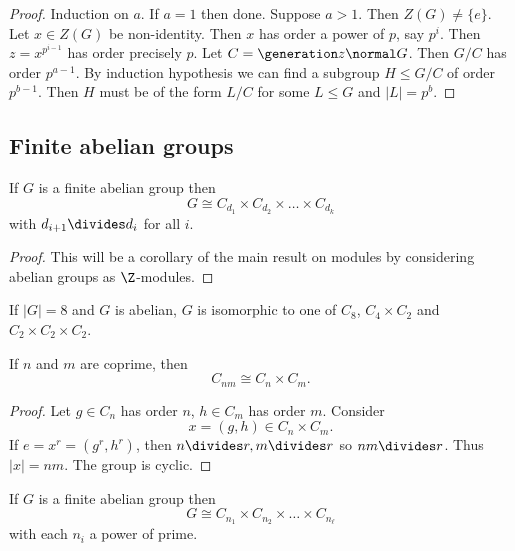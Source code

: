 \documentclass[a4paper]{article}
\theoremstyle{definition}
\begin{document}
\begin{proof}
  Induction on \(a\). If \(a = 1\) then done. Suppose \(a > 1\). Then \(Z(G) \neq \{e\}\). Let \(x \in Z(G)\) be non-identity. Then \(x\) has order  a power of \(p\), say \(p^i\). Then \(z = x^{p^{i - 1}}\) has order precisely \(p\). Let \(C = \generation z \normal G\). Then \(G/C\) has order \(p^{a - 1}\). By induction hypothesis we can find a subgroup \(H \leq G/C\) of order \(p^{b - 1}\). Then \(H\) must be of the form \(L/C\) for some \(L \leq G\) and \(|L| = p^b\).
\end{proof}

\subsection{Finite abelian groups}

\begin{theorem}
  If \(G\) is a finite abelian group then
  \[
    G \cong C_{d_1} \times C_{d_2} \times \dots \times C_{d_k}
  \]
  with \(d_{i + 1} \divides d_i\) for all \(i\).
\end{theorem}

\begin{proof}
  This will be a corollary of the main result on modules by considering abelian groups as \(\Z\)-modules.
\end{proof}

\begin{eg}
  If \(|G| = 8\) and \(G\) is abelian, \(G\) is isomorphic to one of \(C_8\), \(C_4 \times C_2\) and \(C_2 \times C_2 \times C_2\).
\end{eg}

\begin{lemma}
  If \(n\) and \(m\) are coprime, then
  \[
    C_{nm} \cong C_n \times C_m.
  \]
\end{lemma}

\begin{proof}
  Let \(g \in C_n\) has order \(n\), \(h \in C_m\) has order \(m\). Consider
  \[
    x = (g, h) \in C_n \times C_m.
  \]
  If \(e = x^r = (g^r, h^r)\), then \(n \divides r, m \divides r\) so \(nm \divides r\). Thus \(|x| = nm\). The group is cyclic.
\end{proof}

\begin{corollary}
  If \(G\) is a finite abelian group then
  \[
    G \cong C_{n_1} \times C_{n_2} \times \dots \times C_{n_\ell}
  \]
  with each \(n_i\) a power of prime.
\end{corollary}
\end{document}
